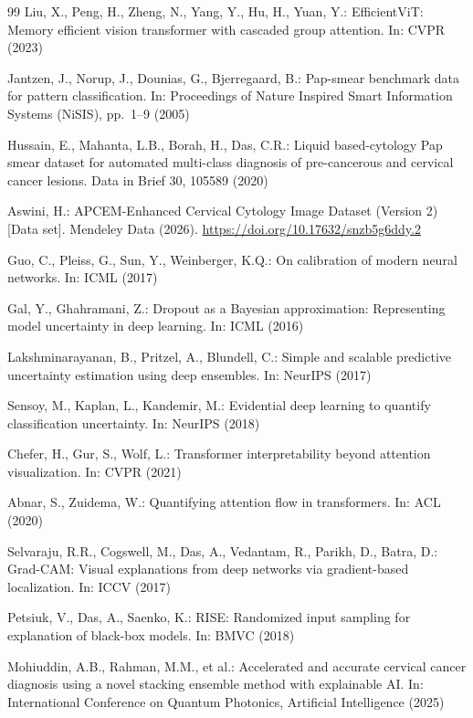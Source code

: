 \documentclass[runningheads]{llncs}
\begin{document}
\begin{thebibliography}{99}
Liu, X., Peng, H., Zheng, N., Yang, Y., Hu, H., Yuan, Y.: EfficientViT:
Memory efficient vision transformer with cascaded group attention. In:
CVPR (2023)

Jantzen, J., Norup, J., Dounias, G., Bjerregaard, B.: Pap-smear benchmark
data for pattern classification. In: Proceedings of Nature Inspired Smart
Information Systems (NiSIS), pp.\ 1--9 (2005)

Hussain, E., Mahanta, L.B., Borah, H., Das, C.R.: Liquid based-cytology
Pap smear dataset for automated multi-class diagnosis of pre-cancerous
and cervical cancer lesions. Data in Brief 30, 105589 (2020)

Aswini, H.: APCEM-Enhanced Cervical Cytology Image Dataset (Version 2)
[Data set]. Mendeley Data (2026). \url{https://doi.org/10.17632/snzb5g6ddy.2}

Guo, C., Pleiss, G., Sun, Y., Weinberger, K.Q.: On calibration of modern
neural networks. In: ICML (2017)

Gal, Y., Ghahramani, Z.: Dropout as a Bayesian approximation:
Representing model uncertainty in deep learning. In: ICML (2016)

Lakshminarayanan, B., Pritzel, A., Blundell, C.: Simple and scalable
predictive uncertainty estimation using deep ensembles. In: NeurIPS (2017)

Sensoy, M., Kaplan, L., Kandemir, M.: Evidential deep learning to
quantify classification uncertainty. In: NeurIPS (2018)

Chefer, H., Gur, S., Wolf, L.: Transformer interpretability beyond
attention visualization. In: CVPR (2021)

Abnar, S., Zuidema, W.: Quantifying attention flow in transformers. In:
ACL (2020)

Selvaraju, R.R., Cogswell, M., Das, A., Vedantam, R., Parikh, D., Batra,
D.: Grad-CAM: Visual explanations from deep networks via gradient-based
localization. In: ICCV (2017)

Petsiuk, V., Das, A., Saenko, K.: RISE: Randomized input sampling for
explanation of black-box models. In: BMVC (2018)

Mohiuddin, A.B., Rahman, M.M., et al.: Accelerated and accurate cervical
cancer diagnosis using a novel stacking ensemble method with explainable
AI. In: International Conference on Quantum Photonics, Artificial
Intelligence (2025)


\end{thebibliography}
\end{document}
